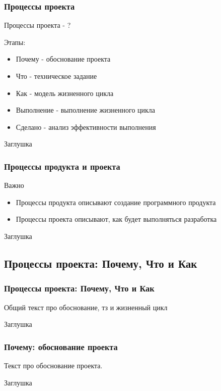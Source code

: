 \documentclass{../industrial-development}
\begin{document}
    \begin{frame} \frametitle{Процессы проекта}
        \begin{definition}
            Процессы проекта - ?
        \end{definition}
        \medskip
        Этапы:
        \begin{itemize}
            \item Почему - обоснование проекта
            \item Что - техническое задание
            \item Как - модель жизненного цикла
            \item Выполнение - выполнение жизненного цикла
            \item Сделано - анализ эффективности выполнения
        \end{itemize}
    \end{frame}
    \lecturenotes
    Заглушка

    \begin{frame} \frametitle{Процессы продукта и проекта}
        \begin{block}{Важно}
            \begin{itemize}
            \item Процессы \alert{продукта} описывают создание программного продукта
            \item Процессы \alert{проекта} описывают, как будет выполняться разработка
            \end{itemize}
        \end{block}
    \end{frame}
    \lecturenotes
    Заглушка

    \subsection{Процессы проекта: Почему, Что и Как}

    \begin{frame} \frametitle{Процессы проекта: Почему, Что и Как}
        Общий текст про обоснование, тз и жизненный цикл
    \end{frame}
    \lecturenotes
    Заглушка
    
    \begin{frame} \frametitle{Почему: обоснование проекта}
        Текст про обоснование проекта.
    \end{frame}
    \lecturenotes
    Заглушка
\end{document}
